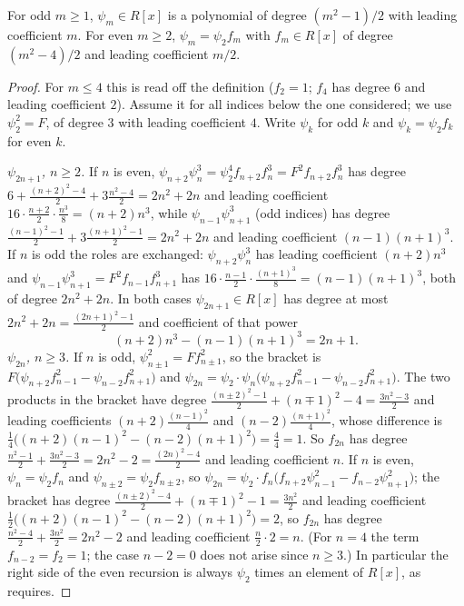 \begin{proposition}[degrees]\label{prop:ellcurves:divpol-deg}
For odd $m\ge1$, $\psi_m\in R[x]$ is a polynomial of degree $(m^2-1)/2$ with leading coefficient $m$. For even $m\ge2$, $\psi_m=\psi_2f_m$ with $f_m\in R[x]$ of
degree $(m^2-4)/2$ and leading coefficient $m/2$.
\end{proposition}

\begin{proof}
For $m\le4$ this is read off the definition ($f_2=1$; $f_4$ has degree $6$ and leading coefficient $2$). Assume it for all indices below the one considered;
we use $\psi_2^2=F$, of degree $3$ with leading coefficient $4$. Write $\psi_k$ for odd $k$ and $\psi_k=\psi_2f_k$ for even $k$.

\emph{$\psi_{2n+1}$, $n\ge2$.} If $n$ is even, $\psi_{n+2}\psi_n^3=\psi_2^4f_{n+2}f_n^3=F^2f_{n+2}f_n^3$ has degree $6+\frac{(n+2)^2-4}2+3\frac{n^2-4}2=2n^2+2n$ and
leading coefficient $16\cdot\frac{n+2}2\cdot\frac{n^3}8=(n+2)n^3$, while $\psi_{n-1}\psi_{n+1}^3$ (odd indices) has degree $\frac{(n-1)^2-1}2+3\frac{(n+1)^2-1}2=2n^2+2n$ and
leading coefficient $(n-1)(n+1)^3$. If $n$ is odd the roles are exchanged: $\psi_{n+2}\psi_n^3$ has leading coefficient $(n+2)n^3$ and
$\psi_{n-1}\psi_{n+1}^3=F^2f_{n-1}f_{n+1}^3$ has $16\cdot\frac{n-1}2\cdot\frac{(n+1)^3}8=(n-1)(n+1)^3$, both of degree $2n^2+2n$. In both cases $\psi_{2n+1}\in R[x]$ has degree at most
$2n^2+2n=\frac{(2n+1)^2-1}2$ and coefficient of that power
\[
(n+2)n^3-(n-1)(n+1)^3=2n+1 .
\]
\emph{$\psi_{2n}$, $n\ge3$.} If $n$ is odd, $\psi_{n\pm1}^2=Ff_{n\pm1}^2$, so the bracket is $F\bigl(\psi_{n+2}f_{n-1}^2-\psi_{n-2}f_{n+1}^2\bigr)$ and
$\psi_{2n}=\psi_2\cdot\psi_n\bigl(\psi_{n+2}f_{n-1}^2-\psi_{n-2}f_{n+1}^2\bigr)$. The two products in the bracket have degree $\frac{(n\pm2)^2-1}2+(n\mp1)^2-4=\frac{3n^2-3}2$ and
leading coefficients $(n+2)\frac{(n-1)^2}4$ and $(n-2)\frac{(n+1)^2}4$, whose difference is $\frac14\bigl((n+2)(n-1)^2-(n-2)(n+1)^2\bigr)=\frac44=1$. So $f_{2n}$ has degree
$\frac{n^2-1}2+\frac{3n^2-3}2=2n^2-2=\frac{(2n)^2-4}2$ and leading coefficient $n$. If $n$ is even, $\psi_n=\psi_2f_n$ and $\psi_{n\pm2}=\psi_2f_{n\pm2}$, so
$\psi_{2n}=\psi_2\cdot f_n\bigl(f_{n+2}\psi_{n-1}^2-f_{n-2}\psi_{n+1}^2\bigr)$; the bracket has degree $\frac{(n\pm2)^2-4}2+(n\mp1)^2-1=\frac{3n^2}2$ and leading coefficient
$\frac12\bigl((n+2)(n-1)^2-(n-2)(n+1)^2\bigr)=2$, so $f_{2n}$ has degree $\frac{n^2-4}2+\frac{3n^2}2=2n^2-2$ and leading coefficient $\frac n2\cdot2=n$. (For $n=4$ the term
$f_{n-2}=f_2=1$; the case $n-2=0$ does not arise since $n\ge3$.) In particular the right side of the even recursion is always $\psi_2$ times an element of
$R[x]$, as  requires.
\end{proof}

